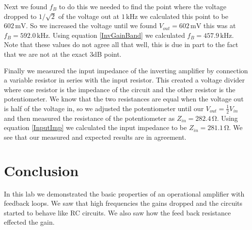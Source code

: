 \documentclass[11pt]{article}
\numberwithin{equation}{section}
\numberwithin{figure}{section}
\numberwithin{table}{section}
\newcommand{\unit}[1]{\ensuremath{\, \mathrm{#1}}}
\begin{document}
Next we found $f_B$ to do this we needed to find the point where the voltage dropped to $1/\sqrt{2}$ of the voltage out at $1\unit{kHz}$ we calculated this point to be $602\unit{mV}$. So we increased the voltage until we found $V_{out}=602\unit{mV}$ this was at $f_B = 592.0\unit{kHz}$. Using equation \ref{InvGainBand} we calculated $f_B=457.9\unit{kHz}$. Note that these values do not agree all that well, this is due in part to the fact that we are not at the exact $3$dB point.

Finally we measured the input impedance of the inverting amplifier by connection a variable resistor in series with the input resistor. This created a voltage divider where one resistor is the impedance of the circuit and the other resistor is the potentiometer. We know that the two resistances are equal when the voltage out is half of the voltage in, so we adjusted the potentiometer until our $V_{out}=\frac{1}{2}V_{in}$ and then measured the resistance of the potentiometer as $Z_{in} = 282.4\unit{\Omega}$. Using equation \ref{InputImp} we calculated the input impedance to be $Z_{in} = 281.1\unit{\Omega}$. We see that our measured and expected results are in agreement.

\section{Conclusion}
In this lab we demonstrated the basic properties of an operational amplifier with feedback loops. We saw that high frequencies the gains dropped and the circuits started to behave like RC circuits. We also saw how the feed back resistance effected the gain.
\end{document}
